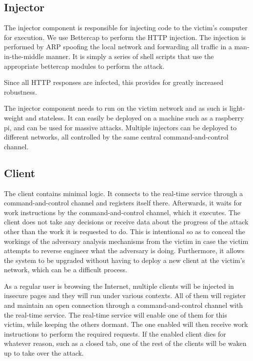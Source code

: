 \documentclass[a4paper, 11 pt, conference]{article}  %
\begin{document}
\subsection{Injector}
The injector component is responsible for injecting code to the victim's
computer for execution. We use Bettercap \cite{c10} to perform the HTTP
injection. The injection is performed by ARP spoofing the local network and
forwarding all traffic in a man-in-the-middle manner. It is simply a series of
shell scripts that use the appropriate bettercap modules to perform the attack.

Since all HTTP responses are infected, this provides for greatly increased
robustness.

The injector component needs to run on the victim network and as such is
light-weight and stateless. It can easily be deployed on a machine such as a
raspberry pi, and can be used for massive attacks. Multiple injectors can be
deployed to different networks, all controlled by the same central
command-and-control channel.

\subsection{Client}

The client contains minimal logic. It connects to the real-time service through
a command-and-control channel and registers itself there. Afterwards, it waits
for work instructions by the command-and-control channel, which it executes. The
client does not take any decisions or receive data about the progress of the
attack other than the work it is requested to do. This is intentional so as
to conceal the workings of the adversary analysis mechanisms from the victim
in case the victim attempts to reverse engineer what the adversary is doing.
Furthermore, it allows the system to be upgraded without having to deploy a
new client at the victim's network, which can be a difficult process.

As a regular user is browsing the Internet, multiple clients will be
injected in insecure pages and they will run under various contexts. All of
them will register and maintain an open connection through a
command-and-control channel with the real-time service. The real-time
service will enable one of them for this victim, while keeping the others
dormant. The one enabled will then receive work instructions to perform the
required requests. If the enabled client dies for whatever reason, such as a
closed tab, one of the rest of the clients will be waken up to take over the
attack.
\end{document}
